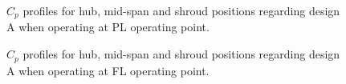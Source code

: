 \begin{figure}[h!]
\begin{minipage}[b]{1\linewidth}
 \centering
\end{minipage}
\caption{$C_p$ profiles for hub, mid-span and shroud positions regarding design A when operating at PL operating point. }
\label{LOADPLM}
\end{figure}


\begin{figure}[h!]
\begin{minipage}[b]{1\linewidth}
 \centering
\end{minipage}
\caption{$C_p$ profiles for hub, mid-span and shroud positions regarding design A when operating at FL operating point.}
\label{LOADFLM}
\end{figure}

